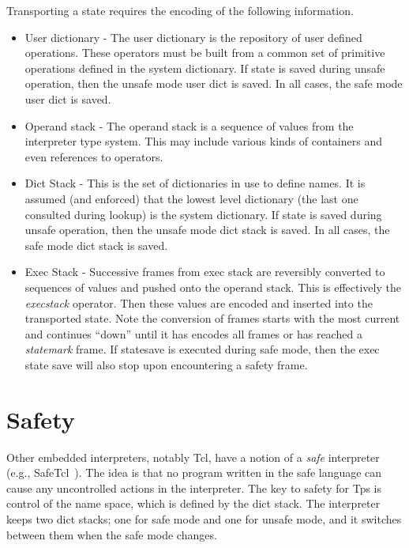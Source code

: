 Transporting a state requires the encoding of the
following information.
\begin{itemize}
\item User dictionary -
The user dictionary is the repository of user defined
operations.  These operators must be built from
a common set of primitive operations defined
in the system dictionary.
If state is saved during unsafe operation, then the unsafe mode user dict
is saved.  In all cases, the safe mode user dict is saved.
\item Operand stack -
The operand stack is a sequence of values
from the interpreter type system.
This may include various kinds of containers
and even references to operators.
\item Dict Stack -
This is the set of dictionaries in use
to define names.
It is assumed (and enforced) that the lowest
level dictionary (the last one consulted during lookup)
is the system dictionary.
If state is saved during unsafe operation, then the unsafe mode dict stack
is saved.  In all cases, the safe mode dict stack is saved.
\item Exec Stack -
Successive frames from exec stack are reversibly converted to
sequences of values and pushed onto the operand stack.
This is effectively the {\em execstack} operator.
Then these values are encoded and inserted into the transported state.
Note the conversion of frames starts with the most current
and continues ``down'' until it has encodes all frames
or has reached a {\em statemark} frame.
If statesave is executed during safe mode, then the exec state save
will also stop upon encountering a safety frame.
\end{itemize}

\section{Safety}
\label{safety}
Other embedded interpreters, notably Tcl,
have a notion of a {\em safe} interpreter
(e.g., SafeTcl~\cite{safetcl93a}).
The idea is that no program written in the safe language
can cause any uncontrolled actions in the interpreter.
The key to safety for Tps is control of the name space,
which is defined by the dict stack.
The interpreter keeps two dict stacks; one for safe mode
and one for unsafe mode, and it switches between them
when the safe mode changes.

